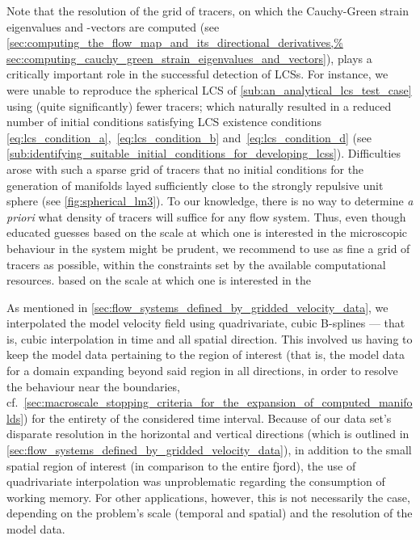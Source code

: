Note that the resolution of the grid of tracers, on which the Cauchy-Green
strain eigenvalues and -vectors are computed (see
\cref{sec:computing_the_flow_map_and_its_directional_derivatives,%
sec:computing_cauchy_green_strain_eigenvalues_and_vectors}), plays a critically
important role in the successful detection of LCSs. For instance, we were
unable to reproduce the spherical LCS of \cref{sub:an_analytical_lcs_test_case}
using (quite significantly) fewer tracers; which naturally resulted in a
reduced number of initial conditions satisfying LCS existence conditions~
\eqref{eq:lcs_condition_a},~\eqref{eq:lcs_condition_b}
and~\eqref{eq:lcs_condition_d} (see
\cref{sub:identifying_suitable_initial_conditions_for_developing_lcss}).
Difficulties arose with such a sparse grid of tracers that no initial
conditions for the generation of manifolds layed sufficiently close to the
strongly repulsive unit sphere (see \cref{fig:spherical_lm3}). To our
knowledge, there is no way to determine \emph{a priori} what density of tracers
will suffice for any flow system. Thus, even though educated guesses based on
the scale at which one is interested in the microscopic behaviour in the system
might be prudent, we recommend to use as fine a grid of tracers as possible,
within the constraints set by the available computational resources.
based on the scale at which one is interested in the

As mentioned in \cref{sec:flow_systems_defined_by_gridded_velocity_data}, we
interpolated the model velocity field using quadrivariate, cubic B-splines ---
that is, cubic interpolation in time and all spatial direction. This involved
us having to keep the model data pertaining to the region of interest (that is,
the model data for a domain expanding beyond said region in all directions, in
order to resolve the behaviour near the boundaries, cf.\
\cref{sec:macroscale_stopping_criteria_for_the_expansion_of_computed_manifolds})
for the entirety of the considered time interval. Because of our data set's
disparate resolution in the horizontal and vertical directions (which is
outlined in \cref{sec:flow_systems_defined_by_gridded_velocity_data}), in
addition to the small spatial region of interest (in comparison to the entire
fjord), the use of quadrivariate interpolation was unproblematic regarding
the consumption of working memory. For other applications, however, this is not
necessarily the case, depending on the problem's scale (temporal and spatial)
and the resolution of the model data.

